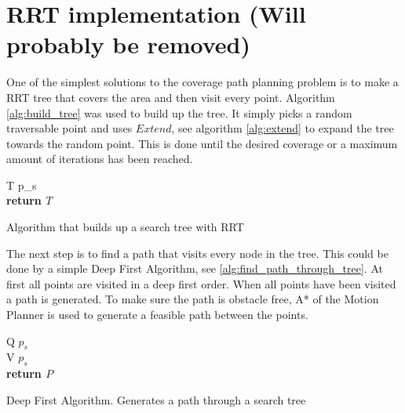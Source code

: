 \section{RRT implementation (Will probably be removed)}
One of the simplest solutions to the coverage path planning problem is to make a RRT tree that covers the area and then visit every point. Algorithm \ref{alg:build_tree} was used to build up the tree. It simply picks a random traversable point and uses $Extend$, see algorithm \ref{alg:extend} to expand the tree towards the random point. This is done until the desired coverage or a maximum amount of iterations has been reached.

\begin{algorithm}[H]
\SetAlgoLined
{}
T \leftarrow p_s \\
\textup{\textbf{return $T$}}
 \caption{Algorithm that builds up a search tree with RRT}
 \label{alg:build_tree}
\end{algorithm}

The next step is to find a path that visits every node in the tree. This could be done by a simple Deep First Algorithm, see \ref{alg:find_path_through_tree}. At first all points are visited in a deep first order. When all points have been visited a path is generated. To make sure the path is obstacle free, A* of the Motion Planner is used to generate a feasible path between the points.

\begin{algorithm}[H]
\SetAlgoLined
{}
Q \leftarrow $p_s$ \\
V \leftarrow $p_s$ \\
\textup{\textbf{return $P$}}
 \caption{Deep First Algorithm. Generates a path through a search tree}
 \label{alg:find_path_through_tree}
\end{algorithm}

